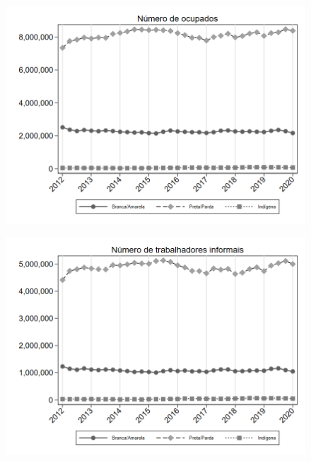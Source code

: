 \begin{frame}[label=_composicao_demografica_raca_n_de_ocupacao]{}
\textit{\hyperlink{_composicao_demografica_raca}{}}
\begin{figure}
  \centering
  \includegraphics[width=1\linewidth]{../../analysis/output/composicao_demografica/raca/_composicao_demografica_raca_n_de_ocupacao.png}
  \caption{}
  \label{fig:_composicao_demografica_raca_n_de_ocupacao}
\end{figure}
\end{frame}

\begin{frame}[label=_composicao_demografica_raca_n_de_informalidade]{}
\textit{\hyperlink{_composicao_demografica_raca}{}}
\begin{figure}
  \centering
  \includegraphics[width=1.0\linewidth]{../../analysis/output/composicao_demografica/raca/_composicao_demografica_raca_n_de_informalidade.png}
  \caption{}
  \label{fig:_composicao_demografica_raca_n_de_informalidade}
\end{figure}
\end{frame}

